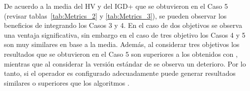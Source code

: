 De acuerdo a la media del HV y del IGD+ que se obtuvieron en el Caso 5 (revisar tablas~\ref{tab:Metrics_2} y \ref{tab:Metrics_3}), se pueden observar los beneficios de integrando los Casos 3 y 4.
%
En el caso de dos objetivos se observa una ventaja significativa, sin embargo en el caso de tres objetivo los Casos 4 y 5 son muy similares en base a la media.
%
Además, al considerar tres objetivos los resultados que se obtuvieron en el Caso 5 son superiores a los obtenidos con \DE{}, mientras que al considerar la versión estándar de \SBX{} se observa un deterioro.
%
Por lo tanto, si el operador \SBX{} es configurado adecuadamente puede generar resultados similares o superiores que los algoritmos \DEMO{}. 

